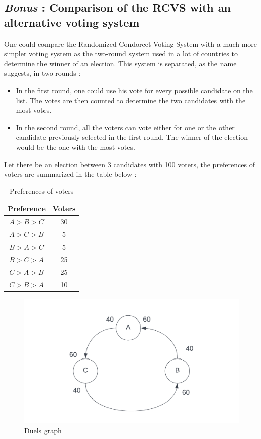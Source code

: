 \subsection{\textit{Bonus} : Comparison of the RCVS with an alternative voting system}
One could compare the Randomized Condorcet Voting System with a much more simpler voting system as the two-round system used in a lot of countries to determine the winner of an election. This system is separated, as the name suggests, in two rounds :
\begin{itemize}
    \item In the first round, one could use his vote for every possible candidate on the list. The votes are then counted to determine the two candidates with the most votes.
    \item In the second round, all the voters can vote either for one or the other candidate previously selected in the first round. The winner of the election would be the one with the most votes.
\end{itemize}

Let there be an election between 3 candidates with 100 voters, the preferences of voters are summarized in the table below :

\begin{table}[!h]
\centering
\begin{tabular}{|c|c|}
\hline
Preference  & Voters \\ \hline
$A > B > C$ & 30     \\ \hline
$A > C > B$ & 5      \\ \hline
$B > A > C$ & 5      \\ \hline
$B > C > A$ & 25     \\ \hline
$C > A > B$ & 25     \\ \hline
$C > B > A$ & 10     \\ \hline
\end{tabular}
\caption{Preferences of voters}
\label{tab:preferences_1.5}
\end{table}

\begin{figure}[!h]
    \centering
    \includegraphics[width=.5\textwidth]{figs/graph_Q1_5.png}
    \caption{Duels graph}
    \label{fig:duel_graph_1.5}
\end{figure}

